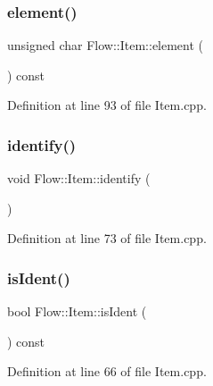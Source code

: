\hypertarget{class_flow_1_1_item_ae108f4ebbdcd75ac4d4ee1d009330040}{}\label{class_flow_1_1_item_ae108f4ebbdcd75ac4d4ee1d009330040} 
\subsubsection{\texorpdfstring{element()}{element()}}
{\footnotesize\ttfamily unsigned char Flow\+::\+Item\+::element (\begin{DoxyParamCaption}{ }\end{DoxyParamCaption}) const}



Definition at line 93 of file Item.\+cpp.

\hypertarget{class_flow_1_1_item_aad72c7a574fa3ab77a4a01f0f7be8589}{}\label{class_flow_1_1_item_aad72c7a574fa3ab77a4a01f0f7be8589} 
\subsubsection{\texorpdfstring{identify()}{identify()}}
{\footnotesize\ttfamily void Flow\+::\+Item\+::identify (\begin{DoxyParamCaption}{ }\end{DoxyParamCaption})}



Definition at line 73 of file Item.\+cpp.

\hypertarget{class_flow_1_1_item_a36f99337aed738b15667a7e5a9d51c37}{}\label{class_flow_1_1_item_a36f99337aed738b15667a7e5a9d51c37} 
\subsubsection{\texorpdfstring{is\+Ident()}{isIdent()}}
{\footnotesize\ttfamily bool Flow\+::\+Item\+::is\+Ident (\begin{DoxyParamCaption}{ }\end{DoxyParamCaption}) const}



Definition at line 66 of file Item.\+cpp.

\hypertarget{class_flow_1_1_item_a59df9c613b1748f81207891269675286}{}\label{class_flow_1_1_item_a59df9c613b1748f81207891269675286} 
